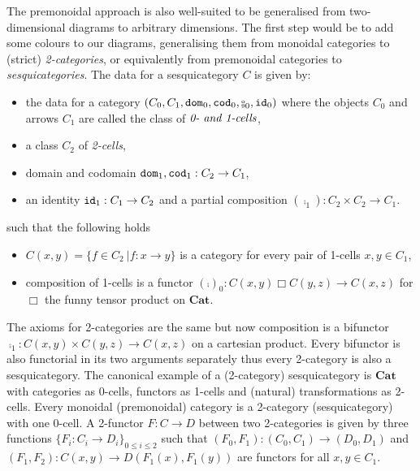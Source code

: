 The premonoidal approach is also well-suited to be generalised from two-dimensional diagrams to arbitrary dimensions.
The first step would be to add some colours to our diagrams, generalising them from monoidal categories to (strict) \emph{2-categories}, or equivalently from premonoidal categories to \emph{sesquicategories}.
The data for a sesquicategory $C$ is given by:
\begin{itemize}
    \item the data for a category $(C_0, C_1, \dom_0, \cod_0, \fcmp_0, \id_0)$ where the objects $C_0$ and arrows $C_1$ are called the class of $\emph{0- and 1-cells}$,
    \item a class $C_2$ of \emph{2-cells},
    \item domain and codomain $\mathtt{dom}_1, \mathtt{cod}_1 : C_2 \to C_1$,
    \item an identity $\mathtt{id}_1 : C_1 \to C_2$ and a partial composition $(\fcmp_1) : C_2 \times C_2 \to C_1$.
\end{itemize}
such that the following holds
\begin{itemize}
    \item $C(x, y) = \{ f \in C_2 \ \vert f : x \to y \}$ is a category for every pair of 1-cells $x, y \in C_1$,
    \item composition of 1-cells is a functor $(\fcmp)_0 : C(x, y) \Box C(y, z) \to C(x, z)$ for $\Box$ the funny tensor product on $\mathbf{Cat}$.
\end{itemize}
The axioms for 2-categories are the same but now composition is a bifunctor $\fcmp_1 : C(x, y) \times C(y, z) \to C(x, z)$ on a cartesian product.
Every bifunctor is also functorial in its two arguments separately thus every 2-category is also a sesquicategory.
The canonical example of a (2-category) sesquicategory is $\mathbf{Cat}$ with categories as 0-cells, functors as 1-cells and (natural) transformations as 2-cells.
Every monoidal (premonoidal) category is a 2-category (sesquicategory) with one 0-cell.
A 2-functor $F : C \to D$ between two 2-categories is given by three functions $\{ F_i : C_i \to D_i \}_{0 \leq i \leq 2}$ such that $(F_0, F_1) : (C_0, C_1) \to (D_0, D_1)$ and $(F_1, F_2) : C(x, y) \to D(F_1(x), F_1(y))$ are functors for all $x, y \in C_1$.

